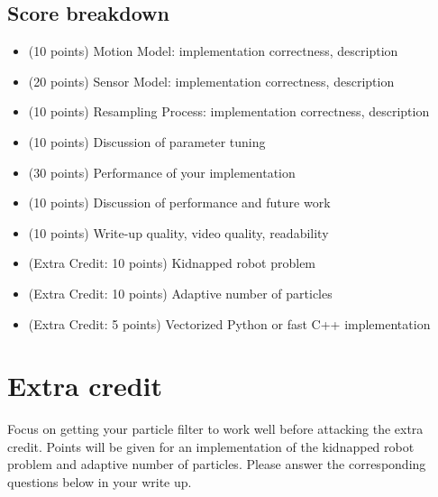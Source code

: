 \documentclass[12pt, a4paper]{article}
\begin{document}
\subsection*{Score breakdown}

\begin{itemize}
	\item (10 points) Motion Model: implementation correctness, description
	\item (20 points) Sensor Model: implementation correctness, description
	\item (10 points) Resampling Process: implementation correctness,
	      description
	\item (10 points) Discussion of parameter tuning
	\item (30 points) Performance of your implementation
	\item (10 points) Discussion of performance and future work
	\item (10 points) Write-up quality, video quality, readability
	\item (Extra Credit: 10 points) Kidnapped robot problem
	\item (Extra Credit: 10 points) Adaptive number of particles
	\item (Extra Credit: 5 points) Vectorized Python or fast C++ implementation
\end{itemize}

\begin{comment}
10) motion model: implementation correctness, description 20) sensor
model: implementation correctness, description 10) resampling model:
implementation correctness, description 10) discussion of parameter
tuning 30) overall correctness (how well do combining the four work)
5) videos (we will have difficulty measuring correctness without videos)
15) write-up quality, readability, and discussion of future work EC
5 - 15 depending on quality) kidnapped robot EC 5 - 10 depending on
quality, impact) adaptive particle numbers
\end{comment}

\vspace{10pt}

\section{Extra credit}

Focus on getting your particle filter to work well before attacking
the extra credit. Points will be given for an implementation of the
kidnapped robot problem and adaptive number of particles. Please answer
the corresponding questions below in your write up.
\end{document}
